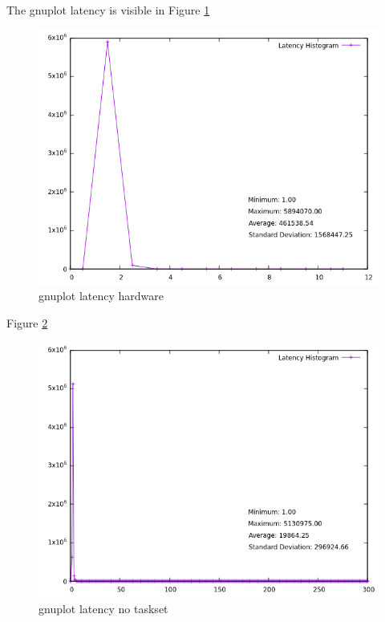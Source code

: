 \documentclass[MMR,Master,english]{twbook}
\begin{document}
The gnuplot latency is visible in Figure \ref{fig:gnuplot_max_latency_hardware}
\begin{figure}[H]
	\centering
	\includegraphics[width=0.8\columnwidth]{masterthesis-documentation/docs/sigmatek/xenomai/hardware/gnuplot_max_latency_hardware.png}
	\caption[gnuplot latency hardware]{gnuplot latency hardware}
	\label{fig:gnuplot_max_latency_hardware}
\end{figure}

Figure \ref{fig:gnuplot_max_max_latency_default}
\begin{figure}[H]
	\centering
	\includegraphics[width=0.8\columnwidth]{masterthesis-documentation/docs/sigmatek/xenomai/default/gnuplot_max_latency_default.png}
	\caption[gnuplot latency no taskset]{gnuplot latency no taskset}
	\label{fig:gnuplot_max_max_latency_default}
\end{figure}
\end{document}
